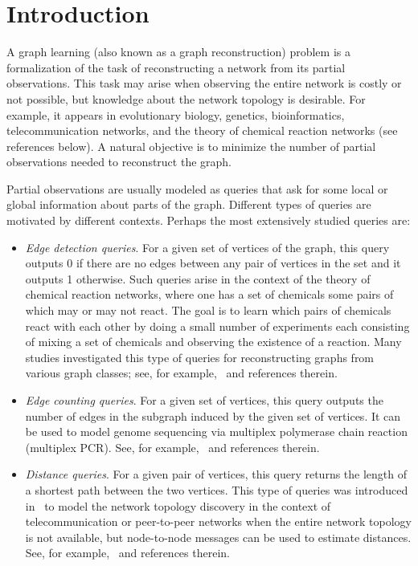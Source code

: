 \documentclass[11pt]{article}
\begin{document}
\newpage

\section{Introduction}\label{sec:intro}
A graph learning (also known as a graph reconstruction) problem is a formalization of the task of reconstructing a network from its partial observations. 
%
This task may arise when observing the entire network is costly or not possible, but knowledge about the network topology is desirable. For example, it appears in evolutionary biology, genetics, bioinformatics, telecommunication networks, and the theory of chemical reaction networks (see references below). A natural objective is to minimize the number of partial observations needed to reconstruct the graph.

Partial observations are usually modeled as queries that ask for some local or global information about parts of the graph. Different types of queries are motivated by different contexts. Perhaps the most extensively studied queries are:

\begin{itemize}%
    \item \emph{Edge detection queries}. For a given set of vertices of the graph, this query outputs 0 if there are no edges between any pair of vertices in the set and it outputs 1 otherwise. Such queries arise in the context of the theory of chemical reaction networks, where one has a set of chemicals some pairs of which may or may not react.
    The goal is to learn which pairs of chemicals react with each other by doing a small number of experiments each consisting of mixing a set of chemicals and observing the existence of a reaction.
    Many studies investigated this type of queries for reconstructing graphs from various graph classes;
    see, for example,~\cite{GK97, ABKRS04, BGK05, AC08, AB19} and  references therein.

    \item \emph{Edge counting queries}. For a given set of vertices, this query outputs the number of edges in the subgraph induced by the given set of vertices. It can be used to model genome sequencing via multiplex polymerase chain reaction (multiplex PCR). 
    See, for example,~\cite{GK00, BGK05, CK10} and references therein.

    \item \emph{Distance queries}. For a given pair of vertices, this query returns the length of a shortest path between the two vertices. This type of queries was introduced in~\cite{BEEHHMR06} to model the network topology discovery in the context of telecommunication or peer-to-peer networks when the entire network topology is not available, but node-to-node messages can be used to estimate distances. See, for example,~\cite{MZ13,KMZ15,RLYW21,MZ23,BG23,KZ24} and references therein.
\end{itemize}
\end{document}

